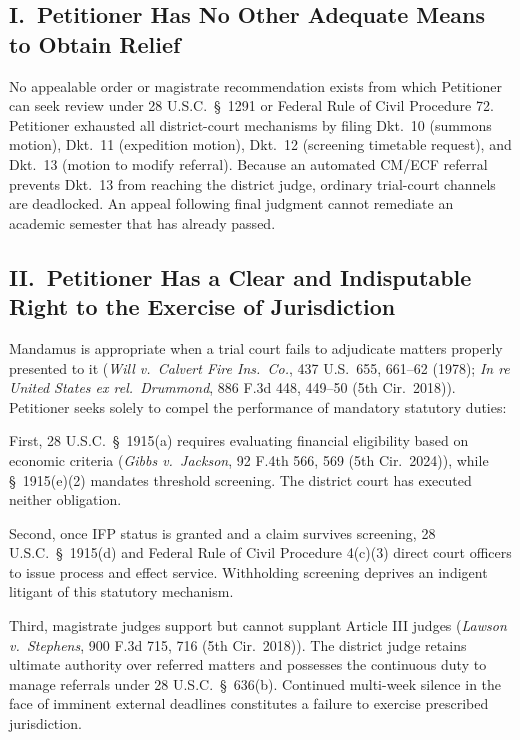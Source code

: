 \documentclass[14pt]{extarticle}
\begin{document}
\subsection*{I.\ Petitioner Has No Other Adequate Means to Obtain Relief}

No appealable order or magistrate recommendation exists from which Petitioner can seek review under 28 U.S.C.\ \S\ 1291 or Federal Rule of Civil Procedure 72. Petitioner exhausted all district-court mechanisms by filing Dkt.\ 10 (summons motion), Dkt.\ 11 (expedition motion), Dkt.\ 12 (screening timetable request), and Dkt.\ 13 (motion to modify referral). Because an automated CM/ECF referral prevents Dkt.\ 13 from reaching the district judge, ordinary trial-court channels are deadlocked. An appeal following final judgment cannot remediate an academic semester that has already passed.

\subsection*{II.\ Petitioner Has a Clear and Indisputable Right to the Exercise of Jurisdiction}

Mandamus is appropriate when a trial court fails to adjudicate matters properly presented to it (\textit{Will v.\ Calvert Fire Ins.\ Co.}, 437 U.S.\ 655, 661--62 (1978); \textit{In re United States ex rel.\ Drummond}, 886 F.3d 448, 449--50 (5th Cir.\ 2018)). Petitioner seeks solely to compel the performance of mandatory statutory duties:

First, 28 U.S.C.\ \S\ 1915(a) requires evaluating financial eligibility based on economic criteria (\textit{Gibbs v.\ Jackson}, 92 F.4th 566, 569 (5th Cir.\ 2024)), while \S\ 1915(e)(2) mandates threshold screening. The district court has executed neither obligation.

Second, once IFP status is granted and a claim survives screening, 28 U.S.C.\ \S\ 1915(d) and Federal Rule of Civil Procedure 4(c)(3) direct court officers to issue process and effect service. Withholding screening deprives an indigent litigant of this statutory mechanism.

Third, magistrate judges support but cannot supplant Article III judges (\textit{Lawson v.\ Stephens}, 900 F.3d 715, 716 (5th Cir.\ 2018)). The district judge retains ultimate authority over referred matters and possesses the continuous duty to manage referrals under 28 U.S.C.\ \S\ 636(b). Continued multi-week silence in the face of imminent external deadlines constitutes a failure to exercise prescribed jurisdiction.
\end{document}
